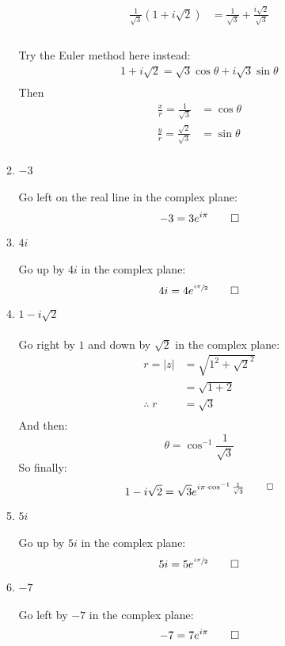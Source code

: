 \begin{enumerate}
\begin{enumerate}
		\begin{align*}
			\frac{1}{\sqrt{3}}(1 + i\sqrt{2}) &= \frac{1}{\sqrt{3}} + \frac{i\sqrt{2}}{\sqrt{3}} \\
		\end{align*}
		\\
		Try the Euler method here instead:
		\begin{align*}
			1 + i\sqrt{2} = \sqrt{3}\cos\theta + i\sqrt{3}\sin\theta \\
		\end{align*}
		Then
		\begin{align*}
			\frac{x}{r} = \frac{1}{\sqrt{3}} &= \cos\theta \\
			\frac{y}{r} = \frac{\sqrt{2}}{\sqrt{3}} &= \sin\theta \\
		\end{align*}
		
		\item $-3$ \\
		\\
		Go left on the real line in the complex plane:
		\[-3 = 3e^{i\pi} \qed \]
		
		\item $4i$ \\
		\\
		Go up by $4i$ in the complex plane:
		\[4i = 4e^{\sfrac{i\pi}{2}} \qed \]
		
		\item $1 -i\sqrt{2}$ \\
		\\
		Go right by $1$ and down by $\sqrt{2}$ in the complex plane:
		\begin{align*}
		r = |z| &= \sqrt{1^2 + \sqrt{2}^2} \\
		&= \sqrt{1 + 2} \\
		\therefore \; r &= \sqrt{3}\\
		\end{align*}
		And then:
		\[ \theta = \cos^{-1}{\frac{1}{\sqrt{3}}} \]
		So finally:
		\[ 1 -i\sqrt{2} = \sqrt{3}e^{i\pi\cdot \cos^{-1}{\frac{1}{\sqrt{3}}} \qed } \]
		
		\item $5i$ \\
		\\
		Go up by $5i$ in the complex plane:
		\[ 5i = 5e^{\sfrac{i\pi}{2}} \qed \]
		
		\item $-7$ \\
		\\
		Go left by $-7$ in the complex plane:
		\[-7 = 7e^{i\pi} \qed \]
		

\end{enumerate}
\end{enumerate}
